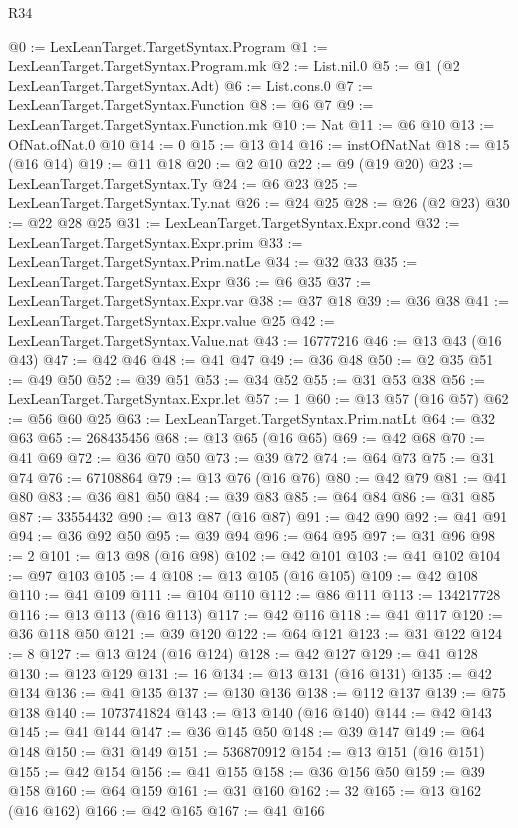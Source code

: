 \begin{lexlean}{R34}
\begin{coremodule}
@0 := LexLeanTarget.TargetSyntax.Program
@1 := LexLeanTarget.TargetSyntax.Program.mk
@2 := List.nil.{0}
@5 := @1 (@2 LexLeanTarget.TargetSyntax.Adt)
@6 := List.cons.{0}
@7 := LexLeanTarget.TargetSyntax.Function
@8 := @6 @7
@9 := LexLeanTarget.TargetSyntax.Function.mk
@10 := Nat
@11 := @6 @10
@13 := OfNat.ofNat.{0} @10
@14 := 0
@15 := @13 @14
@16 := instOfNatNat
@18 := @15 (@16 @14)
@19 := @11 @18
@20 := @2 @10
@22 := @9 (@19 @20)
@23 := LexLeanTarget.TargetSyntax.Ty
@24 := @6 @23
@25 := LexLeanTarget.TargetSyntax.Ty.nat
@26 := @24 @25
@28 := @26 (@2 @23)
@30 := @22 @28 @25
@31 := LexLeanTarget.TargetSyntax.Expr.cond
@32 := LexLeanTarget.TargetSyntax.Expr.prim
@33 := LexLeanTarget.TargetSyntax.Prim.natLe
@34 := @32 @33
@35 := LexLeanTarget.TargetSyntax.Expr
@36 := @6 @35
@37 := LexLeanTarget.TargetSyntax.Expr.var
@38 := @37 @18
@39 := @36 @38
@41 := LexLeanTarget.TargetSyntax.Expr.value @25
@42 := LexLeanTarget.TargetSyntax.Value.nat
@43 := 16777216
@46 := @13 @43 (@16 @43)
@47 := @42 @46
@48 := @41 @47
@49 := @36 @48
@50 := @2 @35
@51 := @49 @50
@52 := @39 @51
@53 := @34 @52
@55 := @31 @53 @38
@56 := LexLeanTarget.TargetSyntax.Expr.let
@57 := 1
@60 := @13 @57 (@16 @57)
@62 := @56 @60 @25
@63 := LexLeanTarget.TargetSyntax.Prim.natLt
@64 := @32 @63
@65 := 268435456
@68 := @13 @65 (@16 @65)
@69 := @42 @68
@70 := @41 @69
@72 := @36 @70 @50
@73 := @39 @72
@74 := @64 @73
@75 := @31 @74
@76 := 67108864
@79 := @13 @76 (@16 @76)
@80 := @42 @79
@81 := @41 @80
@83 := @36 @81 @50
@84 := @39 @83
@85 := @64 @84
@86 := @31 @85
@87 := 33554432
@90 := @13 @87 (@16 @87)
@91 := @42 @90
@92 := @41 @91
@94 := @36 @92 @50
@95 := @39 @94
@96 := @64 @95
@97 := @31 @96
@98 := 2
@101 := @13 @98 (@16 @98)
@102 := @42 @101
@103 := @41 @102
@104 := @97 @103
@105 := 4
@108 := @13 @105 (@16 @105)
@109 := @42 @108
@110 := @41 @109
@111 := @104 @110
@112 := @86 @111
@113 := 134217728
@116 := @13 @113 (@16 @113)
@117 := @42 @116
@118 := @41 @117
@120 := @36 @118 @50
@121 := @39 @120
@122 := @64 @121
@123 := @31 @122
@124 := 8
@127 := @13 @124 (@16 @124)
@128 := @42 @127
@129 := @41 @128
@130 := @123 @129
@131 := 16
@134 := @13 @131 (@16 @131)
@135 := @42 @134
@136 := @41 @135
@137 := @130 @136
@138 := @112 @137
@139 := @75 @138
@140 := 1073741824
@143 := @13 @140 (@16 @140)
@144 := @42 @143
@145 := @41 @144
@147 := @36 @145 @50
@148 := @39 @147
@149 := @64 @148
@150 := @31 @149
@151 := 536870912
@154 := @13 @151 (@16 @151)
@155 := @42 @154
@156 := @41 @155
@158 := @36 @156 @50
@159 := @39 @158
@160 := @64 @159
@161 := @31 @160
@162 := 32
@165 := @13 @162 (@16 @162)
@166 := @42 @165
@167 := @41 @166

\end{coremodule}
\end{lexlean}
